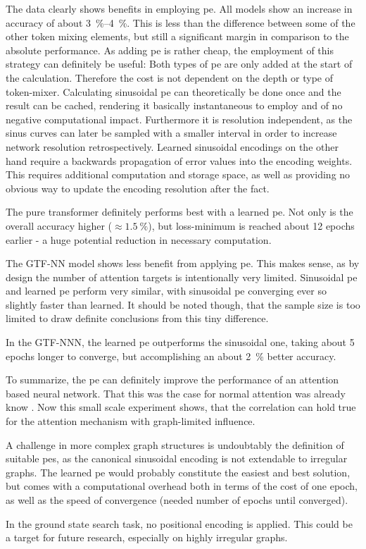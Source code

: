 The data clearly shows benefits in employing pe. 
All models show an increase in accuracy of about \SIrange[]{3}{4}{\percent}. 
This is less than the difference between some of the other token mixing elements, but still a significant margin in comparison to the absolute performance.
As adding pe is rather cheap, the employment of this strategy can definitely be useful:
Both types of pe are only added at the start of the calculation.
Therefore the cost is not dependent on the depth or type of token-mixer.
Calculating sinusoidal pe can theoretically be done once and the result can be cached, rendering it basically instantaneous to employ and of no negative computational impact. Furthermore it is resolution independent, as the sinus curves can later be sampled with a smaller interval in order to increase network resolution retrospectively.
Learned sinusoidal encodings on the other hand require a backwards propagation of error values into the encoding weights.
This requires additional computation and storage space, as well as providing no obvious way to update the encoding resolution after the fact.

The pure transformer definitely performs best with a learned pe. 
Not only is the overall accuracy higher ($\approx \SI[]{1.5}[]{\percent}$), but loss-minimum is reached about 12 epochs earlier - a huge potential reduction in necessary computation.

The GTF-NN model shows less benefit from applying pe.
This makes sense, as by design the number of attention targets is intentionally very limited. 
Sinusoidal pe and learned pe perform very similar, with sinusoidal pe converging ever so slightly faster than learned.
It should be noted though, that the sample size is too limited to draw definite conclusions from this tiny difference.

In the GTF-NNN, the learned pe outperforms the sinusoidal one, taking about 5 epochs longer to converge, but accomplishing an about \SI[]{2}{\percent} better accuracy.

To summarize, the pe can definitely improve the performance of an attention based neural network. 
That this was the case for normal attention was already know \cite{attentionIsAllYouNeed, imageWorth16x16}. 
Now this small scale experiment shows, that the correlation can hold true for the attention mechanism with graph-limited influence.

A challenge in more complex graph structures is undoubtably the definition of suitable pes, as the canonical sinusoidal encoding is not  extendable to irregular graphs.
The learned pe would probably constitute the easiest and best solution, but comes with a computational overhead both in terms of the cost of one epoch, as well as the speed of convergence (needed number of epochs until converged).

In the ground state search task, no positional encoding is applied. 
This could be a target for future research, especially on highly irregular graphs.